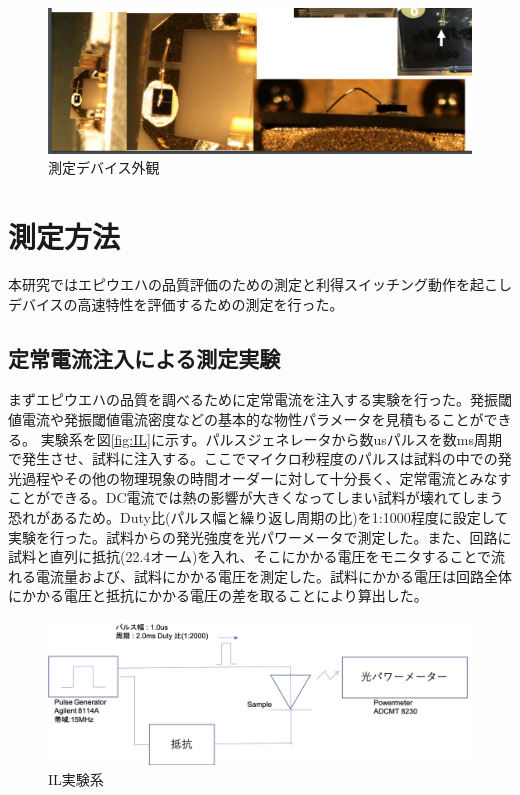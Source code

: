 \begin{figure}[t]
	\centering
	\includegraphics[width=15cm]{figure/fig_2_1_mount.png}
	\caption{測定デバイス外観}
	\label{fig_2_1_mount}
\end{figure}

\section{測定方法}%
本研究ではエピウエハの品質評価のための測定と利得スイッチング動作を起こしデバイスの高速特性を評価するための測定を行った。
\subsection{定常電流注入による測定実験}%
まずエピウエハの品質を調べるために定常電流を注入する実験を行った。発振閾値電流や発振閾値電流密度などの基本的な物性パラメータを見積もることができる。
実験系を図\ref{fig:IL}に示す。パルスジェネレータから数usパルスを数ms周期で発生させ、試料に注入する。ここでマイクロ秒程度のパルスは試料の中での発光過程やその他の物理現象の時間オーダーに対して十分長く、定常電流とみなすことができる。DC電流では熱の影響が大きくなってしまい試料が壊れてしまう恐れがあるため。Duty比(パルス幅と繰り返し周期の比)を1:1000程度に設定して実験を行った。試料からの発光強度を光パワーメータで測定した。また、回路に試料と直列に抵抗(22.4オーム)を入れ、そこにかかる電圧をモニタすることで流れる電流量および、試料にかかる電圧を測定した。試料にかかる電圧は回路全体にかかる電圧と抵抗にかかる電圧の差を取ることにより算出した。
\begin{figure}[htbp]
	\includegraphics[width=15cm]{figure/fig_2_2_IL_setup.png}
	\caption{IL実験系}
	\label{fig_2_2_IL_setup}
\end{figure}

